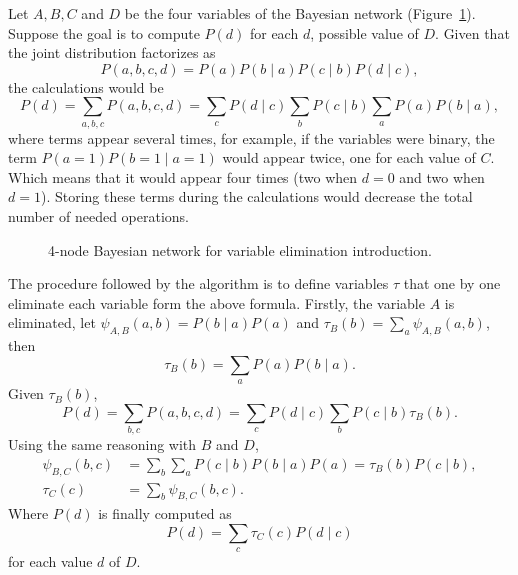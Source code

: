 \begin{exampleth}
  Let \(A, B, C\) and \(D\) be the four variables of the Bayesian network (Figure~\ref{fig:ve_ex}). Suppose the goal is to compute \(P(d)\) for each \(d\), possible value of \(D\).  Given that the joint distribution factorizes as
  \[
    P(a,b,c,d) = P(a)P(b \mid a)P(c \mid b)P(d \mid c),
  \]
  the calculations would be
  \[
    P(d) = \sum_{a,b,c} P(a,b,c,d) = \sum_{c}P(d \mid c)\sum_{b}P(c \mid b)\sum_{a}P(a)P(b \mid a),
  \]
  where terms appear several times, for example, if the variables were binary, the term \(P(a=1)P(b=1 \mid a = 1)\) would appear twice, one for each value of \(C\). Which means that it would appear four times (two when \(d=0\) and two when \(d=1\)). Storing these terms during the calculations would decrease the total number of needed operations.

  \begin{figure}[h]
    \centering
    \caption{4-node Bayesian network for variable elimination introduction.}\label{fig:ve_ex}
  \end{figure}


  The procedure followed by the algorithm is to define variables \(\tau\) that one by one eliminate each variable form the above formula. Firstly, the variable \(A\) is eliminated, let \(\psi_{A,B}(a,b) = P(b\mid a)P(a)\) and \(\tau_{B}(b) = \sum_{a}\psi_{A,B}(a,b)\), then
  \[
    \tau_{B}(b) = \sum_{a}P(a)P(b \mid a).
  \]
  Given \(\tau_{B}(b)\),
  \[
    P(d) = \sum_{b,c} P(a,b,c,d) = \sum_{c}P(d \mid c)\sum_{b}P(c \mid b)\tau_{B}(b).
  \]
  Using the same reasoning with \(B\) and \(D\),
  \[
    \begin{aligned}
      \psi_{B,C}(b,c) &= \sum_{b}\sum_{a}P(c\mid b)P(b\mid a)P(a) = \tau_{B}(b)P(c \mid b),\\
      \tau_{C}(c) &= \sum_{b}\psi_{B,C}(b,c).
    \end{aligned}
  \]
  Where \(P(d)\) is finally computed as
  \[
    P(d) = \sum_{c}\tau_{C}(c)P(d \mid c)
  \]
  for each value \(d\) of \(D\).
\end{exampleth}
